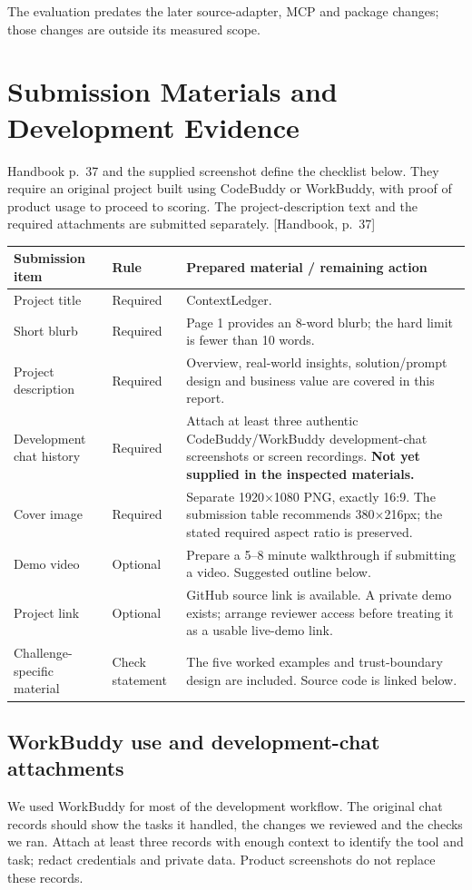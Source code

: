 \documentclass[10pt,a4paper]{article}
\newcommand{\hb}[1]{{\footnotesize\textcolor{Muted}{[Handbook, p.~#1]}}}
\begin{document}
The evaluation predates the later source-adapter, MCP and package changes; those changes are outside its measured scope.

\clearpage
\begingroup\small\setlength{\parskip}{4pt}
\section{Submission Materials and Development Evidence}
Handbook p.~37 and the supplied screenshot define the checklist below. They require an original project built using CodeBuddy or WorkBuddy, with proof of product usage to proceed to scoring. The project-description text and the required attachments are submitted separately. \hb{37}

\begin{tabularx}{\linewidth}{@{}>{\raggedright\arraybackslash}p{34mm}>{\raggedright\arraybackslash}p{20mm}Y@{}}
\toprule
\textbf{Submission item} & \textbf{Rule} & \textbf{Prepared material / remaining action} \\
\midrule
Project title & Required & ContextLedger. \\
Short blurb & Required & Page 1 provides an 8-word blurb; the hard limit is fewer than 10 words. \\
Project description & Required & Overview, real-world insights, solution/prompt design and business value are covered in this report. \\
Development chat history & Required & Attach at least three authentic CodeBuddy/WorkBuddy development-chat screenshots or screen recordings. \textbf{Not yet supplied in the inspected materials.} \\
Cover image & Required & Separate 1920$\times$1080 PNG, exactly 16:9. The submission table recommends 380$\times$216px; the stated required aspect ratio is preserved. \\
Demo video & Optional & Prepare a 5--8 minute walkthrough if submitting a video. Suggested outline below. \\
Project link & Optional & GitHub source link is available. A private demo exists; arrange reviewer access before treating it as a usable live-demo link. \\
Challenge-specific material & Check statement & The five worked examples and trust-boundary design are included. Source code is linked below. \\
\bottomrule
\end{tabularx}

\subsection{WorkBuddy use and development-chat attachments}
We used WorkBuddy for most of the development workflow. The original chat records should show the tasks it handled, the changes we reviewed and the checks we ran. Attach at least three records with enough context to identify the tool and task; redact credentials and private data. Product screenshots do not replace these records.
\end{document}
